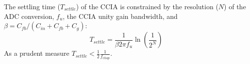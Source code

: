 The settling time ($T_{settle}$) of the CCIA is constrained by the resolution ($N$) of the ADC conversion, $f_u$, the CCIA unity gain bandwidth, and $\beta=C_{fb}/(C_{in} + C_{fb} + C_g)$:
\begin{equation}
    T_{settle} = \frac{1}{\beta 2 \pi f_u} \ln \left( \frac{1}{2^N} \right) \label{eq:Settle_time}
\end{equation}
As a prudent measure $T_{settle} < \frac{1}{2}\frac{1}{f_{chop}}$.
